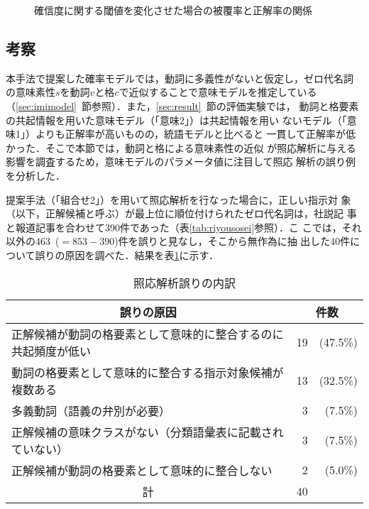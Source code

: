 \begin{figure}[htbp]
\begin{center}
\caption{確信度に関する閾値を変化させた場合の被覆率と正解率の関係}
\label{fig:sikii}
\end{center}
\end{figure}

\subsection{考察}
\label{sec:kousatsu}

本手法で提案した確率モデルでは，動詞に多義性がないと仮定し，ゼロ代名詞
の意味素性$s$を動詞$v$と格$c$で近似することで意味モデルを推定している
（\ref{sec:imimodel}~節参照）．また，\ref{sec:result}~節の評価実験では，
動詞と格要素の共起情報を用いた意味モデル（「意味2」）は共起情報を用い
ないモデル（「意味1」）よりも正解率が高いものの，統語モデルと比べると
一貫して正解率が低かった．そこで本節では，動詞と格による意味素性の近似
が照応解析に与える影響を調査するため，意味モデルのパラメータ値に注目して照応
解析の誤り例を分析した．

提案手法（「組合せ2」）を用いて照応解析を行なった場合に，正しい指示対
象（以下，正解候補と呼ぶ）が最上位に順位付けられたゼロ代名詞は，社説記
事と報道記事を合わせて390件であった（表\ref{tab:riyousosei}参照）．こ
こでは，それ以外の463~($=853-390$)件を誤りと見なし，そこから無作為に抽
出した40件について誤りの原因を調べた．結果を表\ref{tab:causes}に示す．

\begin{table}[htbp]
  \def\baselinestretch{}
  \begin{center}
    \caption{照応解析誤りの内訳}
    \label{tab:causes}
    \small
    \smallskip
    \begin{tabular}{lr@{~}r}
      \hline\hline
      \multicolumn{1}{c}{誤りの原因} & \multicolumn{2}{c}{件数}\\
      \hline
      正解候補が動詞の格要素として意味的に整合するのに共起頻度が低い & 19 & (47.5\%)\\
      動詞の格要素として意味的に整合する指示対象候補が複数ある & 13 & (32.5\%)\\
      多義動詞（語義の弁別が必要）& 3 & (7.5\%)\\
      正解候補の意味クラスがない（分類語彙表に記載されていない）& 3 & (7.5\%)\\
      正解候補が動詞の格要素として意味的に整合しない & 2 & (5.0\%)\\
      \hline
      \multicolumn{1}{c}{計} & 40\\
      \hline
    \end{tabular}
  \end{center}
\end{table}

